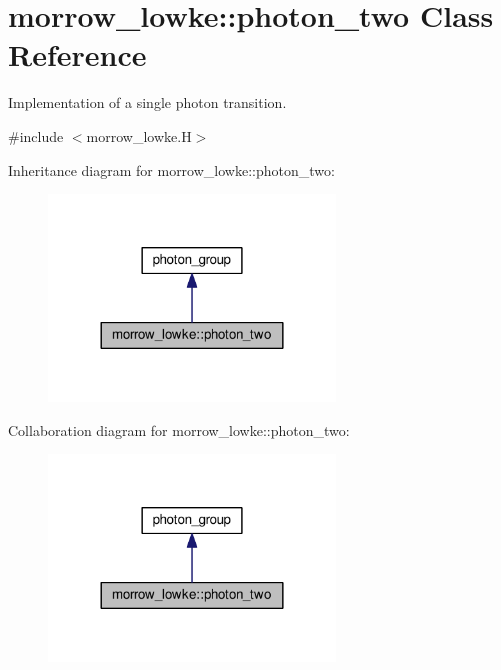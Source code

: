 \hypertarget{classmorrow__lowke_1_1photon__two}{}\section{morrow\+\_\+lowke\+:\+:photon\+\_\+two Class Reference}
\label{classmorrow__lowke_1_1photon__two}


Implementation of a single photon transition.  




{\ttfamily \#include $<$morrow\+\_\+lowke.\+H$>$}



Inheritance diagram for morrow\+\_\+lowke\+:\+:photon\+\_\+two\+:\nopagebreak
\begin{figure}[H]
\begin{center}
\leavevmode
\includegraphics[width=216pt]{classmorrow__lowke_1_1photon__two__inherit__graph}
\end{center}
\end{figure}


Collaboration diagram for morrow\+\_\+lowke\+:\+:photon\+\_\+two\+:\nopagebreak
\begin{figure}[H]
\begin{center}
\leavevmode
\includegraphics[width=216pt]{classmorrow__lowke_1_1photon__two__coll__graph}
\end{center}
\end{figure}
